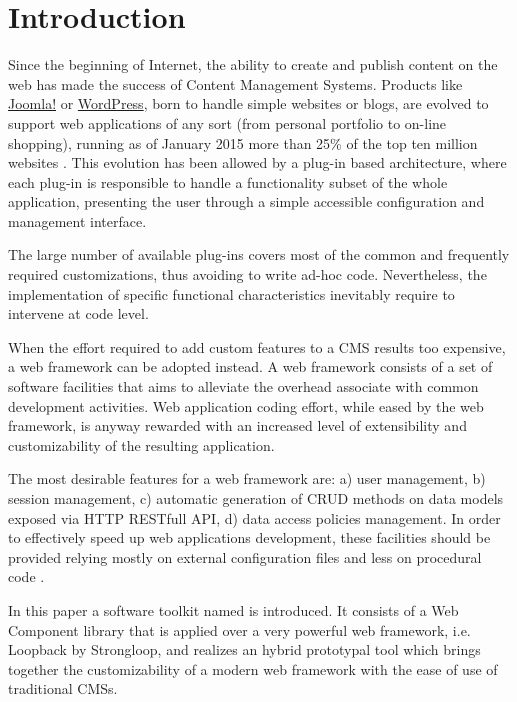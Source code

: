 \section{Introduction}\label{sec:introduction}

Since the beginning of Internet, the ability to create and publish content on the web has made the success of Content Management Systems. Products like \href{http://www.joomla.org/}{Joomla!} or \href{https://wordpress.org/}{WordPress}, born to handle simple websites or blogs, are evolved to support web applications of any sort (from personal portfolio to on-line shopping), running as of January 2015 more than 25\% of the top ten million websites \cite{usage-cms}. This evolution has been allowed by a plug-in based architecture, where each plug-in is responsible to handle a functionality subset of the whole application, presenting the user through a simple accessible configuration and management interface.

The large number of available plug-ins covers most of the common and frequently required customizations, thus avoiding to write ad-hoc code. Nevertheless, the implementation of specific functional characteristics inevitably require to intervene at code level.

When the effort required to add custom features to a CMS results too expensive, a web framework can be adopted instead. A web framework consists of a set of software facilities that aims to alleviate the overhead associate with common development activities. Web application coding effort, while eased by the web framework, is anyway rewarded with an increased level of extensibility and customizability of the resulting application.

The most desirable features for a web framework are: a) user management, b) session management, c) automatic generation of CRUD methods on data models exposed via HTTP RESTfull API, d) data access policies management. In order to effectively speed up web applications development, these facilities should be provided relying mostly on external configuration files and less on procedural code \cite{6859693}.

In this paper a software toolkit named  is introduced. It consists of a Web Component library that is applied over a very powerful web framework, i.e. Loopback by Strongloop, and realizes an hybrid prototypal tool which brings together the customizability of a modern web framework with the ease of use of traditional CMSs.

